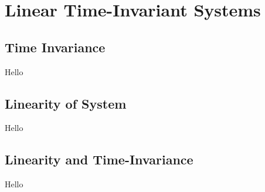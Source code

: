 \chapter{Linear Time-Invariant Systems}

\section{Time Invariance}
Hello

\section{Linearity of System}
Hello

\section{Linearity and Time-Invariance}
Hello
